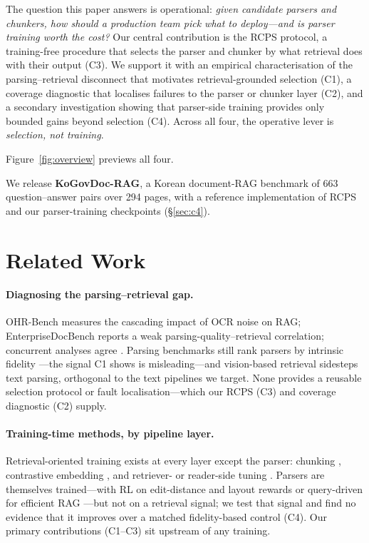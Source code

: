 \documentclass[11pt]{article}
\newcommand{\rcps}{\textsc{RCPS}}
\begin{document}
The question this paper answers is operational: \emph{given candidate parsers and chunkers, how should a production team pick what to deploy---and is parser training worth the cost?} Our central contribution is the \rcps{} protocol, a training-free procedure that selects the parser and chunker by what retrieval does with their output (C3). We support it with an empirical characterisation of the parsing--retrieval disconnect that motivates retrieval-grounded selection (C1), a coverage diagnostic that localises failures to the parser or chunker layer (C2), and a secondary investigation showing that parser-side training provides only bounded gains beyond selection (C4). Across all four, the operative lever is \emph{selection, not training}.

Figure~\ref{fig:overview} previews all four.

We release \textbf{KoGovDoc-RAG}, a Korean document-RAG benchmark of 663 question--answer pairs over 294 pages, with a reference implementation of \rcps{} and our parser-training checkpoints (\S\ref{sec:c4}).

\section{Related Work}

\paragraph{Diagnosing the parsing--retrieval gap.} OHR-Bench \citep{zhang2024ohr} measures the cascading impact of OCR noise on RAG; EnterpriseDocBench \citep{enterprisedocbench2026} reports a weak parsing-quality--retrieval correlation; concurrent analyses agree \citep{goodocr2026, song2026ocr}. Parsing benchmarks still rank parsers by intrinsic fidelity \citep{ouyang2025omnidocbench}---the signal C1 shows is misleading---and vision-based retrieval \citep{faysse2024colpali} sidesteps text parsing, orthogonal to the text pipelines we target. None provides a reusable selection protocol or fault localisation---which our \rcps{} (C3) and coverage diagnostic (C2) supply.

\paragraph{Training-time methods, by pipeline layer.} Retrieval-oriented training exists at every layer except the parser: chunking \citep{jina2024late, duarte2024lumber, zhao2024meta, zhao2025moc, singh2024chunkrag}, contrastive embedding \citep{conti2025insent, zhao2025lmar}, and retriever- or reader-side tuning \citep{nguyen2024rewardrag, chia2025mlongdoc, yan2025rpo}. Parsers are themselves trained---with RL on edit-distance and layout rewards \citep{infinity_parser} or query-driven for efficient RAG \citep{agenticocr}---but not on a retrieval signal; we test that signal and find no evidence that it improves over a matched fidelity-based control (C4). Our primary contributions (C1--C3) sit upstream of any training.
\end{document}
